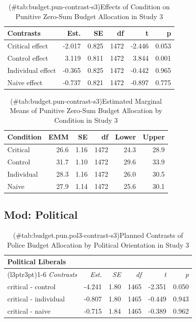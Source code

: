\documentclass[
]{book}
\begin{document}
\begin{table}

\caption{(\#tab:budget.pun-contrast-s3)Effects of Condition on Punitive Zero-Sum Budget Allocation in Study 3}
\centering
\fontsize{13}{15}\selectfont
\begin{tabular}[t]{lrrrrr}
\toprule
Contrasts & Est. & SE & df & t & p\\
\midrule
Critical effect & -2.017 & 0.825 & 1472 & -2.446 & 0.053\\
Control effect & 3.119 & 0.811 & 1472 & 3.844 & 0.001\\
Individual effect & -0.365 & 0.825 & 1472 & -0.442 & 0.965\\
Naive effect & -0.737 & 0.821 & 1472 & -0.897 & 0.775\\
\bottomrule
\end{tabular}
\end{table}

\begin{table}

\caption{(\#tab:budget.pun-contrast-s3)Estimated Marginal Means of Punitive Zero-Sum Budget Allocation by Condition in Study 3}
\centering
\fontsize{13}{15}\selectfont
\begin{tabular}[t]{lrrrrr}
\toprule
Condition & EMM & SE & df & Lower & Upper\\
\midrule
Critical & 26.6 & 1.16 & 1472 & 24.3 & 28.9\\
Control & 31.7 & 1.10 & 1472 & 29.6 & 33.9\\
Individual & 28.3 & 1.16 & 1472 & 26.0 & 30.5\\
Naive & 27.9 & 1.14 & 1472 & 25.6 & 30.1\\
\bottomrule
\end{tabular}
\end{table}

\hypertarget{mod-political-10}{%
\subsection{Mod: Political}\label{mod-political-10}}

\begin{table}

\caption{(\#tab:budget.pun.pol3-contrast-s3)Planned Contrasts of Police Budget Allocation by Political Orientation in Study 3}
\centering
\begin{tabular}[t]{lrrrrr}
\toprule
\multicolumn{6}{l}{Political Liberals} \\
\cmidrule(l{3pt}r{3pt}){1-6}
\em{Contrasts} & \em{Est.} & \em{SE} & \em{df} & \em{t} & \em{p}\\
\midrule
critical - control & -4.241 & 1.80 & 1465 & -2.351 & 0.050\\
critical - individual & -0.807 & 1.80 & 1465 & -0.449 & 0.943\\
critical - naive & -0.715 & 1.84 & 1465 & -0.389 & 0.962\\
\bottomrule
\end{tabular}
\end{table}
\end{document}
